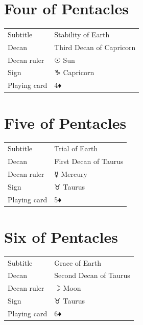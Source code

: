 \newpage
\section*{Four of Pentacles}

\begin{center}
\end{center}

\vspace{4mm}
\noindent\begin{tabular}{@{}l@{\quad}l@{}}
Subtitle & Stability of Earth \\
Decan & Third Decan of Capricorn \\
Decan ruler & {\symbfont ☉} Sun \\
Sign & {\symbfont ♑} Capricorn \\
Playing card & 4♦ \\
\end{tabular}

\newpage
\section*{Five of Pentacles}

\begin{center}
\end{center}

\vspace{4mm}
\noindent\begin{tabular}{@{}l@{\quad}l@{}}
Subtitle & Trial of Earth \\
Decan & First Decan of Taurus \\
Decan ruler & {\symbfont ☿} Mercury \\
Sign & {\symbfont ♉} Taurus \\
Playing card & 5♦ \\
\end{tabular}

\newpage
\section*{Six of Pentacles}

\begin{center}
\end{center}

\vspace{4mm}
\noindent\begin{tabular}{@{}l@{\quad}l@{}}
Subtitle & Grace of Earth \\
Decan & Second Decan of Taurus \\
Decan ruler & {\symbfont ☽} Moon \\
Sign & {\symbfont ♉} Taurus \\
Playing card & 6♦ \\
\end{tabular}

